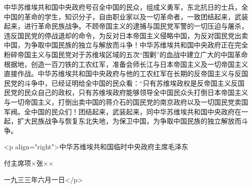中华苏维埃共和国中央政府号召全中国的民众，组成义勇军，东北抗日的士兵，全中国的革命的学生，知识分子，自由职业家以及一切革命者，一致团结起来，武装起来，进行革命民族战争。不顾帝国主义的逮捕与国民党军警的一切压迫与屠杀，违反国民党的停战退却的命令，为反对日本帝国主义侵略中国，为反对国民党出卖中国，为争取中国民族的独立与解放而斗争！中华苏维埃共和国中央政府正在完全粉碎帝国主义与国民党对于苏维埃区域的五次“围剿”的血战中建立广大的中国革命根据地，创造一百刀铁的工农红军，准备会师长江与日本帝国主义及一切帝国主义直接作战。中华苏维埃共和国中央政府与他的工农红军在长期的反帝国主义与反国民党的斗争中，已经证明给全中国的民众看：“只有苏维埃政权是反帝国主义反国民党的民众自己的政权，只有苏维埃政府能够领导全中国民众头打倒日本帝国主义与一切帝国主义，打倒出卖中国的蒋介石的国民党的南京政府以及一切国民党卖国军阀。全中国的民众们！团结起来，武装起来，同中华苏维埃共和国中央政府在一起，扩大民族战争与恢复东北失地，为保卫中国，为争取中国民族的独立解放而斗争。

<p align="right">中华苏维埃共和国临时中央政府主席毛泽东

 付主席项×张××

一九三三年六月一日</p>

